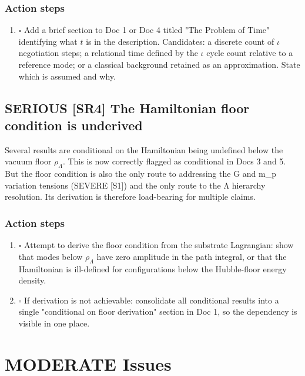 \documentclass[11pt,letterpaper]{article}
\begin{document}
\subsubsection{Action steps}
\label{sec:org35f8dd9}

\begin{enumerate}
\item{$\square$} Add a brief section to Doc 1 or Doc 4 titled "The Problem of Time"
identifying what \(t\) is in the description. Candidates: a discrete count
of \(\iota\) negotiation steps; a relational time defined by the \(\iota\) cycle
count relative to a reference mode; or a classical background retained as an
approximation. State which is assumed and why.
\end{enumerate}

\subsection{{\bfseries\sffamily SERIOUS} [SR4] The Hamiltonian floor condition is underived}
\label{sec:org23bf7d7}
Several results are conditional on the Hamiltonian being undefined below the
vacuum floor \(\rho_\Lambda\). This is now correctly flagged as conditional in
Docs 3 and 5. But the floor condition is also the only route to addressing the
G and m\_p variation tensions (SEVERE [S1]) and the only route to the Λ hierarchy
resolution. Its derivation is therefore load-bearing for multiple claims.

\subsubsection{Action steps}
\label{sec:org436a0be}

\begin{enumerate}
\item{$\square$} Attempt to derive the floor condition from the substrate Lagrangian: show
that modes below \(\rho_\Lambda\) have zero amplitude in the path integral, or
that the Hamiltonian is ill-defined for configurations below the Hubble-floor
energy density.
\item{$\square$} If derivation is not achievable: consolidate all conditional results into
a single "conditional on floor derivation" section in Doc 1, so the dependency
is visible in one place.
\end{enumerate}

\section{{\bfseries\sffamily MODERATE} Issues}
\label{sec:org81d121e}
\end{document}

